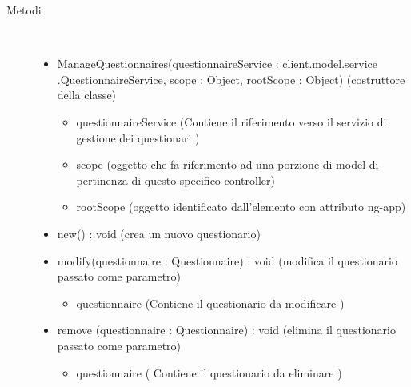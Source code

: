 \begin{description}
\item[Metodi] \hfill \\
 \vspace{-7mm}
\begin{itemize}
\item ManageQuestionnaires(questionnaireService : client.model.service .QuestionnaireService, scope : Object, rootScope : Object) (costruttore della classe)\begin{itemize}
\item questionnaireService (Contiene il riferimento verso il servizio di  gestione dei questionari )
\item scope (oggetto che fa riferimento ad una porzione di model di pertinenza di questo specifico controller)
\item rootScope (oggetto identificato dall’elemento con attributo ng-app)
\end{itemize}

\item new() : void (crea un nuovo questionario)
\item modify(questionnaire : Questionnaire) : void (modifica il questionario passato come parametro)\begin{itemize}
\item questionnaire (Contiene il questionario da modificare )
\end{itemize}

\item remove (questionnaire : Questionnaire) : void (elimina il questionario passato come parametro)\begin{itemize}
\item questionnaire ( Contiene il questionario da eliminare )
\end{itemize}

\end{itemize}

\end{description}

\vspace{0.5cm}
